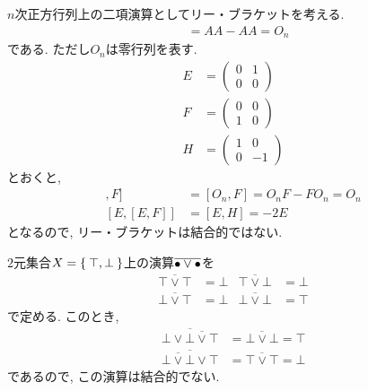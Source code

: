 \begin{nonexample}
  $n$次正方行列上の二項演算としてリー・ブラケットを考える.
  \begin{align*}
    [A,A]&=AA-AA=O_{n}
  \end{align*}
  である.  ただし$O_n$は零行列を表す.
  \begin{align*}
    E&=\begin{pmatrix}0&1\\0&0\end{pmatrix}\\
    F&=\begin{pmatrix}0&0\\1&0\end{pmatrix}\\
    H&=\begin{pmatrix}1&0\\0&-1\end{pmatrix}
  \end{align*}
  とおくと,
  \begin{align*}
    [[E,E],F]&=[O_n,F]=O_nF-FO_n=O_n\\
    [E,[E,F]]&=[E,H]=-2E
  \end{align*}
  となるので, リー・ブラケットは結合的ではない.
\end{nonexample}
\begin{nonexample}
  $2$元集合$X=\Set{\top, \bot}$上の演算$\overline{{\bullet}\lor{\bullet}}$を
  \begin{align*}
    \overline{\top \lor \top} &= \bot&
    \overline{\top \lor \bot} &= \bot\\
    \overline{\bot \lor \top} &= \bot&
    \overline{\bot \lor \bot} &= \top    
  \end{align*}
  で定める.
  このとき,
  \begin{align*}
    \overline{\bot \lor \overline{\bot \lor \top}} &=\overline{\bot \lor \bot}=\top\\
    \overline{\overline{\bot \lor \bot} \lor \top}&=
    \overline{\top \lor \top}=\bot
  \end{align*}
  であるので, この演算は結合的でない.
\end{nonexample}

